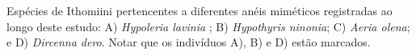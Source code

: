 Espécies de Ithomiini pertencentes a diferentes anéis miméticos registradas ao longo deste estudo: A) \textit{Hypoleria lavinia} ; B) \textit{Hypothyris ninonia}; C) \textit{Aeria olena}; e D) \textit{Dircenna dero}. Notar que os indivíduos A), B) e D) estão marcados. \label{fig:2.1.1}
